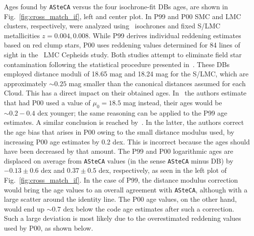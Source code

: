 \documentclass{aa}
\begin{document}
%
%
Ages found by \texttt{ASteCA} versus the four isochrone-fit DBs ages,
are shown in Fig.~\ref{fig:cross_match_if}, left and center plot.
%
In P99 and P00 SMC and LMC clusters, respectively, were analyzed
using~\cite{Bertelli_1994} isochrones and fixed S/LMC metallicities
$z{=}0.004, 0.008$. While P99 derives individual reddening estimates based on
red clump stars, P00 uses reddening values determined for 84 lines of sight
in the~\cite{Udalski_1999} LMC Cepheids study.
%
Both studies attempt to eliminate field star contamination following the
statistical procedure presented in~\cite{Mateo_1986}.
These DBs employed distance moduli of 18.65 mag and 18.24 mag for the S/LMC,
which are approximately ${\sim}0.25$ mag smaller than the canonical distances
assumed for each Cloud. This has a direct impact on their obtained ages.
%
In~\cite{de_Grijs_2006} the authors estimate that had P00 used a value
of $\mu_0{=}18.5$ mag instead, their ages would be ${\sim}0.2{-}0.4$
dex younger; the same reasoning can be applied to the P99 age estimates.
A similar conclusion is reached by~\cite{Baumgardt_2013}.
In the latter, the authors correct the age bias that arises in P00 owing to the
small distance modulus used, by increasing P00 age estimates by 0.2 dex. This is
incorrect because the ages should have been decreased by that amount. 
%
The P99 and P00 logarithmic ages are displaced on average from \texttt{ASteCA}
values (in the sense \texttt{ASteCA} minus DB) by $-0.13{\pm}0.6$ dex and $0.37
{\pm}0.5$ dex, respectively, as seen in the left plot of Fig.~\ref{fig:cross_match_if}.
In the case of P99, the distance modulus correction would bring the age values
to an overall agreement with \texttt{ASteCA}, although with a large scatter
around the identity line.
%
The P00 age values, on the other hand, would end up ${\sim}0.7$ dex below the code
age estimates  after such a correction. Such a large deviation is most likely due
to the overestimated reddening values used by P00, as shown below.
\end{document}
